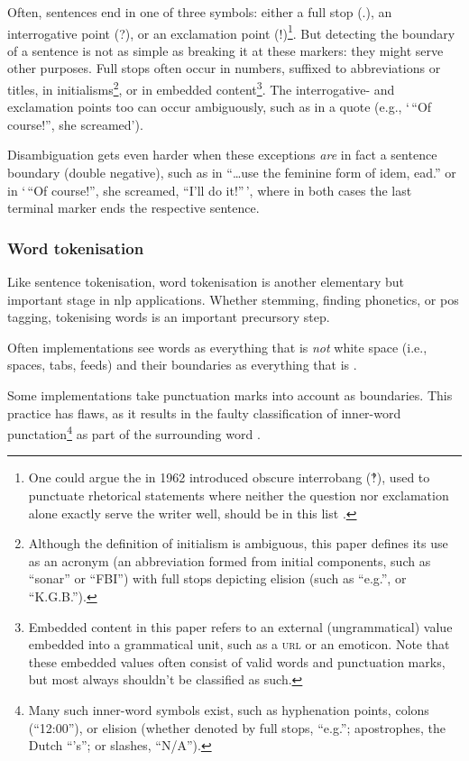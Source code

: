 Often, sentences end in one of three symbols: either a full stop (.),
  an interrogative point (?), or an exclamation point (!)\footnote{One
    could argue the in 1962 introduced
    obscure interrobang (‽), used to punctuate rhetorical statements where
    neither the question nor exclamation alone exactly serve the writer
    well, should be in this list \autocite{interrobang-mks.com}.}.
But detecting the boundary of a sentence is not as simple as breaking it at
  these markers: they might serve other purposes.
Full stops often occur in numbers, suffixed to abbreviations or titles,
  in initialisms\footnote{Although
    the definition of initialism is ambiguous, this paper defines its use
    as an acronym (an abbreviation formed from initial components, such as
    ``sonar'' or ``FBI'') with full stops depicting elision (such as
    ``e.g.'', or ``K.G.B.'').},
  or in embedded content\footnote{Embedded
    content in this paper refers to an external (ungrammatical) value
    embedded into a grammatical unit, such as a \textsc{url} or an emoticon.
    Note that these embedded values often consist of valid words and
    punctuation marks, but most always shouldn't be classified as such.}.
The interrogative- and exclamation points too can occur ambiguously, such as
  in a quote (e.g., `\,``Of course!'', she screamed').

Disambiguation gets even harder when these exceptions \emph{are} in fact a
  sentence boundary (double negative), such as in
  ``\ldots{}use the feminine form of idem, ead.'' or in
  `\,``Of course!'', she screamed, ``I'll do it!''\,', where in both
  cases the last terminal marker ends the respective sentence.

\subsubsection{Word tokenisation}\label{word-tokenisation}

Like sentence tokenisation, word tokenisation is another elementary but
important stage in \gls{nlp} applications. Whether stemming, finding
phonetics, or \gls{pos} tagging, tokenising words is an important
precursory step.

Often implementations see words as everything that is \emph{not} white
  space (i.e., spaces, tabs, feeds) and their boundaries as everything that
  is \autocite{loadfive/knwl-source-code}.

Some implementations take punctuation marks into account as boundaries.
This practice has flaws, as it results in the faulty classification of
  inner-word punctation\footnote{Many such inner-word symbols exist, such
    as hyphenation points, colons (``12:00''), or elision (whether denoted
    by full stops, ``e.g.''; apostrophes, the Dutch ``'s''; or slashes,
    ``N/A'').}
  as part of the surrounding word \autocite{NaturalNode/natural-source-code}.

